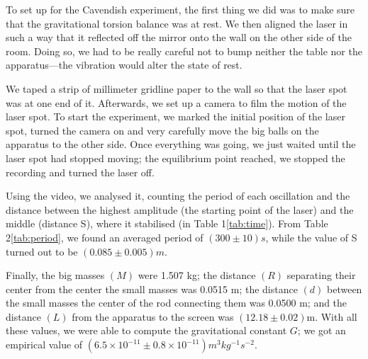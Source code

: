 \documentclass[12pt]{article}
\begin{document}
To set up for the Cavendish experiment, the first thing we did was to make sure that the gravitational torsion balance was at rest. We then aligned the laser in such a way that it reflected off the mirror onto the wall on the other side of the room. Doing so, we had to be really careful not to bump neither the table nor the apparatus—the vibration would alter the state of rest.

We taped a strip of millimeter gridline paper to the wall so that the laser spot was at one end of it. Afterwards, we set up a camera to film the motion of the laser spot. To start the experiment, we marked the initial position of the laser spot, turned the camera on and very carefully move the big balls on the apparatus to the other side. Once everything was going, we just waited until the laser spot had stopped moving; the equilibrium point reached, we stopped the recording and turned the laser off.

Using the video, we analysed it, counting the period of each oscillation and the distance between the highest amplitude (the starting point of the laser) and the middle (distance S), where it stabilised (in Table 1\ref{tab:time}). From Table 2\ref{tab:period}, we found an averaged period of $(300 \pm 10) s$, while the value of S turned out to be $(0.085 \pm 0.005) \si{m}$.

Finally, the big masses $(M)$ were 1.507 kg; the distance $(R)$ separating their center from the center the small masses was 0.0515 m; the distance $(d)$ between the small masses the center of the rod connecting them was 0.0500 m; and the distance $(L)$ from the apparatus to the screen was $(12.18 \pm 0.02)$m. With all these values, we were able to compute the gravitational constant $G$; we got an empirical value of $(6.5 \times 10^{-11} \pm 0.8 \times 10^{-11}) \si{m^3kg^{-1}s^{-2}}$.
\end{document}
